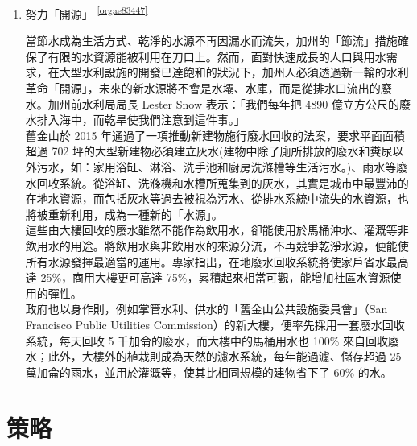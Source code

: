 \documentclass[a4paper,12pt]{article}
\begin{document}
\begin{enumerate}
\item 努力「開源」 \textsuperscript{\ref{orgae83447}}
\label{sec:org1dd13e2}

當節水成為生活方式、乾淨的水源不再因漏水而流失，加州的「節流」措施確保了有限的水資源能被利用在刀口上。然而，面對快速成長的人口與用水需求，在大型水利設施的開發已達飽和的狀況下，加州人必須透過新一輪的水利革命「開源」，未來的新水源將不會是水壩、水庫，而是從排水口流出的廢水。加州前水利局局長 Lester Snow 表示：「我們每年把 4890 億立方公尺的廢水排入海中，而乾旱使我們注意到這件事。」\\

舊金山於 2015 年通過了一項推動新建物施行廢水回收的法案，要求平面面積超過 702 坪的大型新建物必須建立灰水(建物中除了廁所排放的廢水和糞尿以外污水，如：家用浴缸、淋浴、洗手池和廚房洗滌槽等生活污水。)、雨水等廢水回收系統。從浴缸、洗滌機和水槽所蒐集到的灰水，其實是城市中最豐沛的在地水資源，而包括灰水等過去被視為污水、從排水系統中流失的水資源，也將被重新利用，成為一種新的「水源」。\\

這些由大樓回收的廢水雖然不能作為飲用水，卻能使用於馬桶沖水、灌溉等非飲用水的用途。將飲用水與非飲用水的來源分流，不再競爭乾淨水源，便能使所有水源發揮最適當的運用。專家指出，在地廢水回收系統將使家戶省水最高達 25\%，商用大樓更可高達 75\%，累積起來相當可觀，能增加社區水資源使用的彈性。\\

政府也以身作則，例如掌管水利、供水的「舊金山公共設施委員會」（San Francisco Public Utilities Commission）的新大樓，便率先採用一套廢水回收系統，每天回收 5 千加侖的廢水，而大樓中的馬桶用水也 100\% 來自回收廢水；此外，大樓外的植栽則成為天然的濾水系統，每年能過濾、儲存超過 25 萬加侖的雨水，並用於灌溉等，使其比相同規模的建物省下了 60\% 的水。\\

\newpage
\end{enumerate}

\section{策略}
\label{sec:org6878ade}
\end{document}
